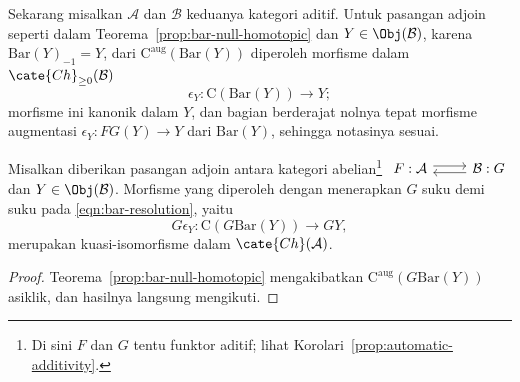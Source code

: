 Sekarang misalkan $\mathcal{A}$ dan $\mathcal{B}$ keduanya kategori
aditif. Untuk pasangan adjoin seperti dalam
Teorema~\ref{prop:bar-null-homotopic} dan
$Y\in\Obj(\mathcal{B})$, karena $\mathrm{Bar}(Y)_{-1}=Y$, dari
$\mathrm{C}^{\mathrm{aug}}(\mathrm{Bar}(Y))$ diperoleh morfisme
dalam $\cate{Ch}_{\geq0}(\mathcal{B})$
\begin{equation}\label{eqn:bar-resolution}
	\epsilon_Y: \mathrm{C}(\mathrm{Bar}(Y)) \to Y;
\end{equation}
morfisme ini kanonik dalam $Y$, dan bagian berderajat nolnya tepat morfisme
augmentasi $\epsilon_Y:FG(Y)\to Y$ dari $\mathrm{Bar}(Y)$, sehingga
notasinya sesuai.

\begin{corollary}\label{prop:bar-exactness-G}
	Misalkan diberikan pasangan adjoin antara kategori abelian\footnote{Di sini $F$ dan
	$G$ tentu funktor aditif; lihat Korolari~\ref{prop:automatic-additivity}.}
	$\begin{tikzcd}
		F : \mathcal{A} \arrow[shift left, r] & \mathcal{B}: G \arrow[shift left, l]
	\end{tikzcd}$
	dan $Y\in\Obj(\mathcal{B})$. Morfisme yang diperoleh dengan menerapkan
	$G$ suku demi suku pada \eqref{eqn:bar-resolution}, yaitu
	\[ G\epsilon_Y: \mathrm{C}(G\mathrm{Bar}(Y)) \to GY ,\]
	merupakan kuasi-isomorfisme dalam $\cate{Ch}(\mathcal{A})$.
\end{corollary}
\begin{proof}
	Teorema~\ref{prop:bar-null-homotopic} mengakibatkan
	$\mathrm{C}^{\mathrm{aug}}(G\mathrm{Bar}(Y))$ asiklik, dan hasilnya
	langsung mengikuti.
\end{proof}


